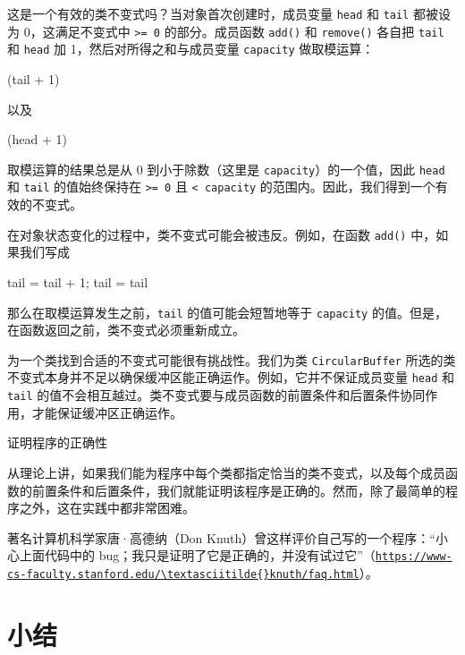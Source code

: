 这是一个有效的类不变式吗？当对象首次创建时，成员变量 \texttt{head} 和 \texttt{tail} 都被设为 0，这满足不变式中 \texttt{>= 0} 的部分。成员函数 \texttt{add()} 和 \texttt{remove()} 各自把 \texttt{tail} 和 \texttt{head} 加 1，然后对所得之和与成员变量 \texttt{capacity} 做取模运算：

\begin{codebox}
    (tail + 1)%
\end{codebox}

以及

\begin{codebox}
    (head + 1)%
\end{codebox}

取模运算的结果总是从 0 到小于除数（这里是 \texttt{capacity}）的一个值，因此 \texttt{head} 和 \texttt{tail} 的值始终保持在 \texttt{>= 0} 且 \texttt{< capacity} 的范围内。因此，我们得到一个有效的不变式。

在对象状态变化的过程中，类不变式可能会被违反。例如，在函数 \texttt{add()} 中，如果我们写成

\begin{codebox}
tail = tail + 1;
tail = tail%
\end{codebox}

那么在取模运算发生之前，\texttt{tail} 的值可能会短暂地等于 \texttt{capacity} 的值。但是，在函数返回之前，类不变式必须重新成立。

为一个类找到合适的不变式可能很有挑战性。我们为类 \texttt{Circular\allowbreak{}Buffer} 所选的类不变式本身并不足以确保缓冲区能正确运作。例如，它并不保证成员变量 \texttt{head} 和 \texttt{tail} 的值不会相互越过。类不变式要与成员函数的前置条件和后置条件协同作用，才能保证缓冲区正确运作。

\begin{mySidebar}{证明程序的正确性}

从理论上讲，如果我们能为程序中每个类都指定恰当的类不变式，以及每个成员函数的前置条件和后置条件，我们就能证明该程序是正确的。然而，除了最简单的程序之外，这在实践中都非常困难。

著名计算机科学家唐·高德纳（Don Knuth）曾这样评价自己写的一个程序：“小心上面代码中的 bug；我只是证明了它是正确的，并没有试过它”（\href{https://www-cs-faculty.stanford.edu/~knuth/faq.html}{\nolinkurl{https://www-cs-faculty.stanford.edu/\textasciitilde{}knuth/faq.html}}）。
\end{mySidebar}

\section*{小结}

